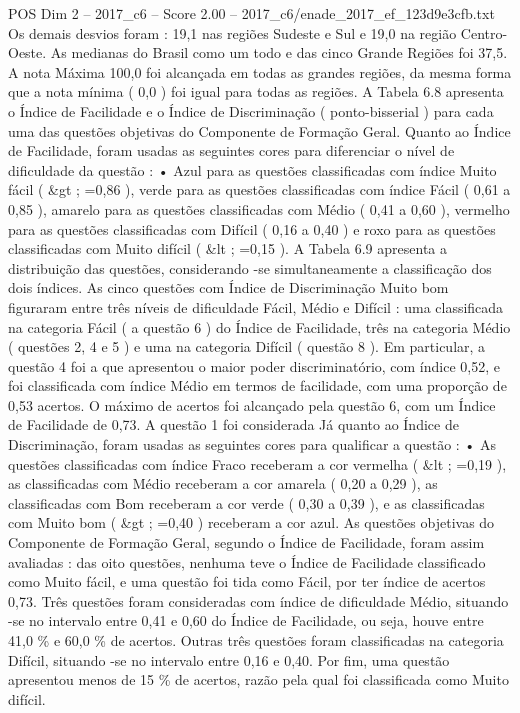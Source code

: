 \begin{textsample}{POS Dim 2 – 2017\_c6 – Score 2.00 – 2017\_c6/enade\_2017\_ef\_123d9e3cfb.txt}
Os demais desvios foram : 19,1 nas regiões Sudeste e Sul e 19,0 na região Centro-Oeste.
As medianas do Brasil como um todo e das cinco Grande Regiões foi 37,5.
A nota Máxima 100,0 foi alcançada em todas as grandes regiões, da mesma forma que a nota mínima ( 0,0 ) foi igual para todas as regiões.
A Tabela 6.8 apresenta o Índice de Facilidade e o Índice de Discriminação ( ponto-bisserial ) para cada uma das questões objetivas do Componente de Formação Geral.
Quanto ao Índice de Facilidade, foram usadas as seguintes cores para diferenciar o nível de dificuldade da questão : • Azul para as questões classificadas com índice Muito fácil ( \&gt ; =0,86 ), verde para as questões classificadas com índice Fácil ( 0,61 a 0,85 ), amarelo para as questões classificadas com Médio ( 0,41 a 0,60 ), vermelho para as questões classificadas com Difícil ( 0,16 a 0,40 ) e roxo para as questões classificadas com Muito difícil ( \&lt ; =0,15 ).
A Tabela 6.9 apresenta a distribuição das questões, considerando -se simultaneamente a classificação dos dois índices.
As cinco questões com Índice de Discriminação Muito bom figuraram entre três níveis de dificuldade Fácil, Médio e Difícil : uma classificada na categoria Fácil ( a questão 6 ) do Índice de Facilidade, três na categoria Médio ( questões 2, 4 e 5 ) e uma na categoria Difícil ( questão 8 ).
Em particular, a questão 4 foi a que apresentou o maior poder discriminatório, com índice 0,52, e foi classificada com índice Médio em termos de facilidade, com uma proporção de 0,53 acertos.
O máximo de acertos foi alcançado pela questão 6, com um Índice de Facilidade de 0,73.
A questão 1 foi considerada Já quanto ao Índice de Discriminação, foram usadas as seguintes cores para qualificar a questão : • As questões classificadas com índice Fraco receberam a cor vermelha ( \&lt ; =0,19 ), as classificadas com Médio receberam a cor amarela ( 0,20 a 0,29 ), as classificadas com Bom receberam a cor verde ( 0,30 a 0,39 ), e as classificadas com Muito bom ( \&gt ; =0,40 ) receberam a cor azul.
As questões objetivas do Componente de Formação Geral, segundo o Índice de Facilidade, foram assim avaliadas : das oito questões, nenhuma teve o Índice de Facilidade classificado como Muito fácil, e uma questão foi tida como Fácil, por ter índice de acertos 0,73.
Três questões foram consideradas com índice de dificuldade Médio, situando -se no intervalo entre 0,41 e 0,60 do Índice de Facilidade, ou seja, houve entre 41,0 \% e 60,0 \% de acertos.
Outras três questões foram classificadas na categoria Difícil, situando -se no intervalo entre 0,16 e 0,40.
Por fim, uma questão apresentou menos de 15 \% de acertos, razão pela qual foi classificada como Muito difícil.

\end{textsample}
